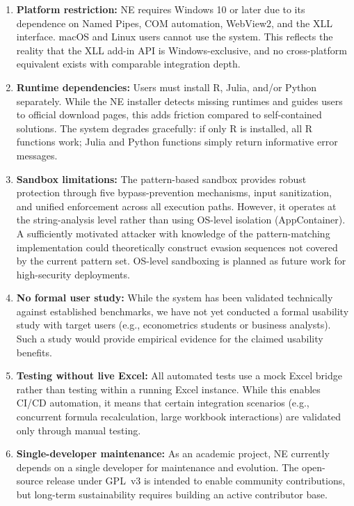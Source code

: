 \documentclass[preprint,12pt,authoryear]{elsarticle}
\newcommand{\neven}{NE\raisebox{0.2ex}{v}\rotatebox[origin=c]{180}{E}\rotatebox[origin=c]{180}{N}}
\begin{document}
\begin{enumerate}
    \item \textbf{Platform restriction:} \neven{} requires Windows 10 or later due to its dependence on Named Pipes, COM automation, WebView2, and the XLL interface. macOS and Linux users cannot use the system. This reflects the reality that the XLL add-in API is Windows-exclusive, and no cross-platform equivalent exists with comparable integration depth.

    \item \textbf{Runtime dependencies:} Users must install R, Julia, and/or Python separately. While the \neven{} installer detects missing runtimes and guides users to official download pages, this adds friction compared to self-contained solutions. The system degrades gracefully: if only R is installed, all R functions work; Julia and Python functions simply return informative error messages.

    \item \textbf{Sandbox limitations:} The pattern-based sandbox provides robust protection through five bypass-prevention mechanisms, input sanitization, and unified enforcement across all execution paths. However, it operates at the string-analysis level rather than using OS-level isolation (AppContainer). A sufficiently motivated attacker with knowledge of the pattern-matching implementation could theoretically construct evasion sequences not covered by the current pattern set. OS-level sandboxing is planned as future work for high-security deployments.

    \item \textbf{No formal user study:} While the system has been validated technically against established benchmarks, we have not yet conducted a formal usability study with target users (e.g., econometrics students or business analysts). Such a study would provide empirical evidence for the claimed usability benefits.

    \item \textbf{Testing without live Excel:} All automated tests use a mock Excel bridge rather than testing within a running Excel instance. While this enables CI/CD automation, it means that certain integration scenarios (e.g., concurrent formula recalculation, large workbook interactions) are validated only through manual testing.

    \item \textbf{Single-developer maintenance:} As an academic project, \neven{} currently depends on a single developer for maintenance and evolution. The open-source release under GPL~v3 is intended to enable community contributions, but long-term sustainability requires building an active contributor base.
\end{enumerate}
\end{document}
